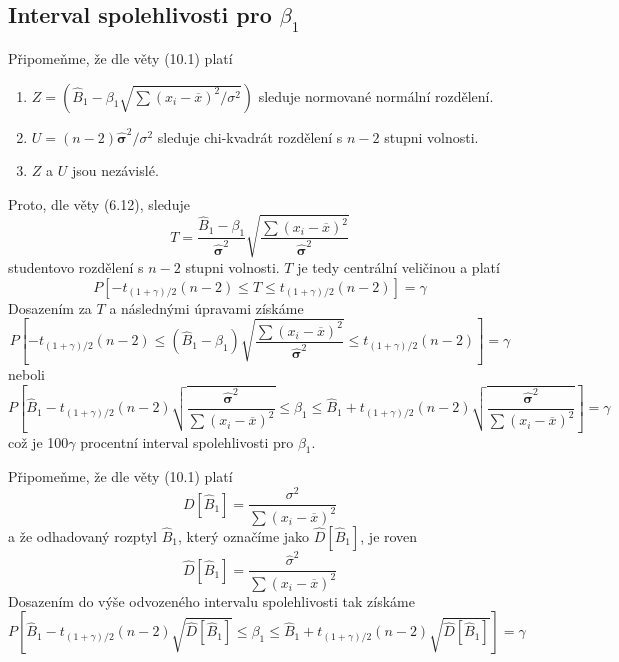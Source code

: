 \subsection{Interval spolehlivosti pro $\beta_1$}

Připomeňme, že dle věty (10.1) platí
\begin{enumerate}
\item $Z = (\hat{B}_1 - \beta_1\sqrt{\sum(x_i - \overline{x})^2/\sigma^2})$ sleduje normované normální rozdělení.
\item $U = (n - 2)\hat{\boldsymbol \sigma}^2 / \sigma^2$ sleduje chi-kvadrát rozdělení s $n - 2$ stupni volnosti.
\item $Z$ a $U$ jsou nezávislé.
\end{enumerate}
Proto, dle věty (6.12), sleduje
\begin{equation*}
T = \frac{\hat{B}_1 - \beta_1}{\hat{\boldsymbol \sigma}^2}\sqrt{\frac{\sum (x_i - \overline{x})^2}{\hat{\boldsymbol \sigma}^2}}
\end{equation*}
studentovo rozdělení s $n - 2$ stupni volnosti. $T$ je tedy centrální veličinou a platí
\begin{equation*}
P[-t_{(1 + \gamma)/2}(n - 2) \le T \le t_{(1 + \gamma)/2}(n - 2)] = \gamma
\end{equation*}
Dosazením za $T$ a následnými úpravami získáme
\begin{equation}
P\left[-t_{(1 + \gamma)/2}(n - 2) \le (\hat{B}_1 - \beta_1) \sqrt{\frac{\sum (x_i - \overline{x})^2}{\hat{\boldsymbol \sigma}^2}} \le t_{(1 + \gamma)/2}(n - 2) \right] = \gamma
\end{equation}
neboli
\begin{equation*}
P\left[\hat{B}_1 - t_{(1 + \gamma)/2}(n - 2)\sqrt{\frac{\hat{\boldsymbol \sigma}^2}{\sum (x_i - \overline{x})^2}} \le \beta_1 \le \hat{B}_1 + t_{(1 + \gamma)/2}(n - 2)\sqrt{\frac{\hat{\boldsymbol \sigma}^2}{\sum (x_i - \overline{x})^2}} \right] = \gamma
\end{equation*}
což je 100$\gamma$ procentní interval spolehlivosti pro $\beta_1$.

Připomeňme, že dle věty (10.1) platí
\begin{equation*}
D[\hat{B}_1] = \frac{\sigma^2}{\sum (x_i - \overline{x})^2}
\end{equation*}
a že odhadovaný rozptyl $\hat{B}_1$, který označíme jako $\hat{D}[\hat{B}_1]$, je roven
\begin{equation*}
\hat{D}[\hat{B}_1] = \frac{\hat{\sigma}^2}{\sum (x_i - \overline{x})^2}
\end{equation*}
Dosazením do výše odvozeného intervalu spolehlivosti tak získáme
\begin{equation}
P[\hat{B}_1 - t_{(1 + \gamma)/2}(n - 2)\sqrt{\hat{D}[\hat{B}_1]} \le \beta_1 \le \hat{B}_1 + t_{(1 + \gamma)/2}(n - 2)\sqrt{\hat{D}[\hat{B}_1]}] = \gamma
\end{equation}


